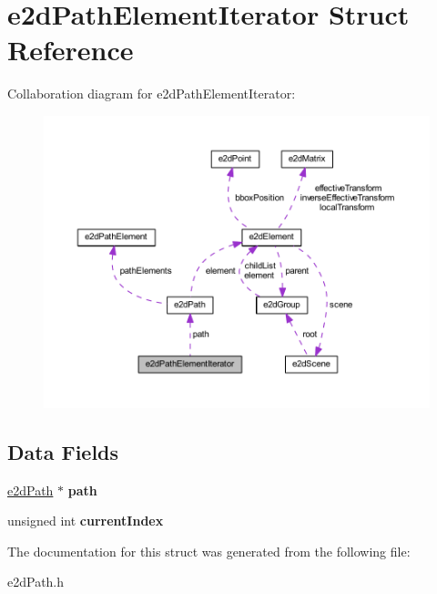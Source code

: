 \hypertarget{structe2dPathElementIterator}{\section{e2d\-Path\-Element\-Iterator Struct Reference}
\label{structe2dPathElementIterator}
}


Collaboration diagram for e2d\-Path\-Element\-Iterator\-:
\nopagebreak
\begin{figure}[H]
\begin{center}
\leavevmode
\includegraphics[width=350pt]{structe2dPathElementIterator__coll__graph}
\end{center}
\end{figure}
\subsection*{Data Fields}
\begin{DoxyCompactItemize}
\item 
\hypertarget{structe2dPathElementIterator_a318773d3a24970f193ecb5e2fcdce1a7}{\hyperlink{structe2dPath}{e2d\-Path} $\ast$ {\bfseries path}}\label{structe2dPathElementIterator_a318773d3a24970f193ecb5e2fcdce1a7}

\item 
\hypertarget{structe2dPathElementIterator_a932f59c8e81a171eb21af8d204d1c13d}{unsigned int {\bfseries current\-Index}}\label{structe2dPathElementIterator_a932f59c8e81a171eb21af8d204d1c13d}

\end{DoxyCompactItemize}


The documentation for this struct was generated from the following file\-:\begin{DoxyCompactItemize}
\item 
e2d\-Path.\-h\end{DoxyCompactItemize}

